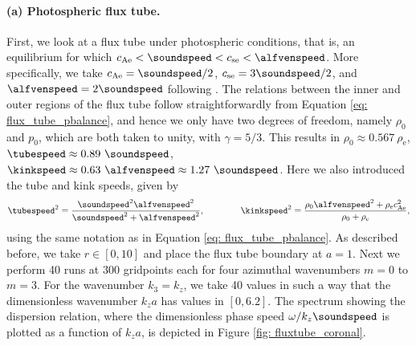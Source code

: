 \paragraph{(a) Photospheric flux tube.}
First, we look at a flux tube under photospheric conditions, that is, an equilibrium for which $c_\text{Ae} < \soundspeed < c_\text{se} < \alfvenspeed$. More specifically, we take $c_\text{Ae} = \soundspeed/2$, $c_\text{se} = 3\soundspeed / 2$, and $\alfvenspeed = 2\soundspeed$ following \citet[Figure 6.5]{book_roberts}. The relations between the inner and outer regions of the flux tube follow straightforwardly from Equation \eqref{eq: flux_tube_pbalance}, and hence we only have two degrees of freedom, namely $\rho_0$ and $p_0$, which are both taken to unity, with $\gamma = 5/3$. This results in $\rho_0 \approx 0.567~\rho_\text{e}$, $\tubespeed \approx 0.89~\soundspeed$,
$\kinkspeed \approx 0.63~\alfvenspeed \approx 1.27~\soundspeed$. Here we also introduced the tube and kink speeds, given by
\begin{equation}
  \tubespeed^2 = \frac{\soundspeed^2 \alfvenspeed^2}{\soundspeed^2 + \alfvenspeed^2}, \qquad\qquad
  \kinkspeed^2 = \frac{\rho_0 \alfvenspeed^2 + \rho_\text{e}c_\text{Ae}^2}{\rho_0 + \rho_\text{e}},
\end{equation}
using the same notation as in Equation \eqref{eq: flux_tube_pbalance}. As described before, we take $r \in [0, 10]$ and place the flux tube boundary at $a = 1$. Next we perform 40 runs at 300 gridpoints each for four azimuthal wavenumbers $m = 0$ to $m = 3$. For the wavenumber $k_3 = k_z$, we take 40 values in such a way that the dimensionless wavenumber $k_z a$ has values in $[0, 6.2]$. The spectrum showing the dispersion relation, where the dimensionless phase speed $\omega / k_z \soundspeed$ is plotted as a function of $k_z a$, is depicted in Figure \ref{fig: fluxtube_coronal}.

